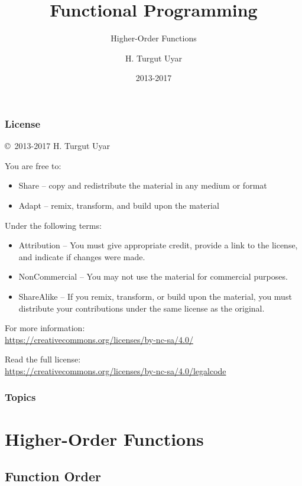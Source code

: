 \documentclass[dvipsnames]{beamer}
\title{Functional Programming}
\subtitle{Higher-Order Functions}
\author{H. Turgut Uyar}
\date{2013-2017}
\theoremstyle{plain}
\begin{document}
\begin{frame}
  \titlepage
\end{frame}

\begin{frame}
  \frametitle{License}

  \hfill
  \copyright~2013-2017 H. Turgut Uyar

  \vfill
  \begin{footnotesize}
    You are free to:
    \begin{itemize}
      \itemsep0em
      \item Share -- copy and redistribute the material in any medium or format
      \item Adapt -- remix, transform, and build upon the material
    \end{itemize}

    Under the following terms:
    \begin{itemize}
      \itemsep0em
      \item Attribution -- You must give appropriate credit, provide a link to
        the license, and indicate if changes were made.

      \item NonCommercial -- You may not use the material for commercial
        purposes.

      \item ShareAlike -- If you remix, transform, or build upon the material,
        you must distribute your contributions under the same license as the
        original.
    \end{itemize}

    For more information:\\
    \url{https://creativecommons.org/licenses/by-nc-sa/4.0/}

    \smallskip
    Read the full license:\\
    \url{https://creativecommons.org/licenses/by-nc-sa/4.0/legalcode}
  \end{footnotesize}
\end{frame}

\begin{frame}
  \frametitle{Topics}
  \tableofcontents
\end{frame}

\section{Higher-Order Functions}

\subsection{Function Order}
\end{document}
